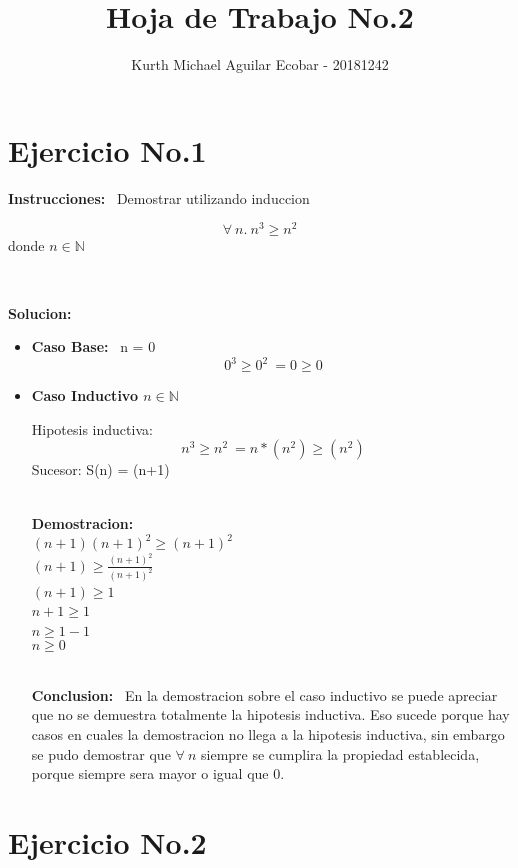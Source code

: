 \documentclass[10pt,a4paper]{article}
\begin{document}
\title{Hoja de Trabajo No.2}
\author{Kurth Michael Aguilar Ecobar - 20181242}
\maketitle
\section*{Ejercicio No.1}
\begin{large}
\textbf{Instrucciones:} \ {Demostrar utilizando induccion}  
\end{large}
\[  
	\forall\ n.\ n^3\geq n^2
\]
donde $n\in\mathbb{N}$

\
\\\begin{large}
\textbf{Solucion:}
\end{large}

\begin{itemize}
\item \textbf{Caso Base:} \ n = 0
 \[ \ 0^{3}\geq 0^{2}\ = 0\geq 0 \]

\item \textbf{Caso Inductivo $n\in\mathbb{N}$}

 Hipotesis inductiva: \[
        \ n^3\geq n^2 \ = n*(n^2)\geq (n^2)
\]
 Sucesor: S(n) = (n+1) 
 
\
\\\textbf{Demostracion:}
\
\\ $ (n+1)(n+1)^2\geq (n+1)^2 $ 
\
\\ $ (n+1)\geq \frac{(n+1)^2}{(n+1)^2}$
\
\\ $ (n+1)\geq 1$
\
\\ $ n+1\geq 1 $
\
\\ $ n\geq 1-1 $
\
\\ $ n\geq 0 $ 

\
\\\textbf{Conclusion:}
\ En la demostracion sobre el caso inductivo se puede apreciar que no se demuestra totalmente la hipotesis inductiva. Eso sucede porque hay casos en cuales la demostracion no llega a la hipotesis inductiva, sin embargo se pudo demostrar que $ \forall\ n$ siempre se cumplira la propiedad establecida, porque siempre sera mayor o igual que 0. 



\end{itemize}

\section*{Ejercicio No.2}
\end{document}
